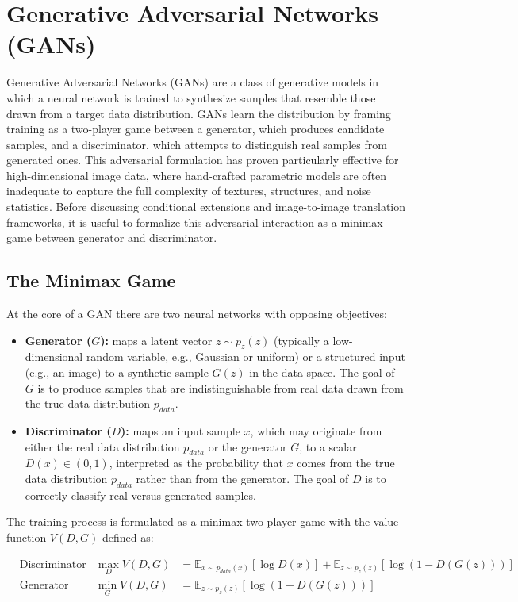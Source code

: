 \section{Generative Adversarial Networks (GANs)}
\label{sec:gan_theory}
Generative Adversarial Networks (GANs) \cite{Goodfellow_2014} are a class of generative models in which a neural network is trained to synthesize samples that resemble those drawn from a target data distribution.
GANs learn the distribution by framing training as a two-player game between a generator, which produces candidate samples, and a discriminator, which attempts to distinguish real samples from generated ones.
This adversarial formulation has proven particularly effective for high-dimensional image data, where hand-crafted parametric models are often inadequate to capture the full complexity of textures, structures, and noise statistics.
Before discussing conditional extensions and image-to-image translation frameworks, it is useful to formalize this adversarial interaction as a minimax game between generator and discriminator.

\subsection{The Minimax Game}
At the core of a GAN there are two neural networks with opposing objectives:
\begin{itemize}
    \item \textbf{Generator ($G$):} maps a latent vector $z \sim p_z(z)$ (typically a low-dimensional random variable, e.g., Gaussian or uniform) or a structured input (e.g., an image) to a synthetic sample $G(z)$ in the data space. The goal of $G$ is to produce samples that are indistinguishable from real data drawn from the true data distribution $p_{data}$.
    \item \textbf{Discriminator ($D$):} maps an input sample $x$, which may originate from either the real data distribution $p_{data}$ or the generator $G$, to a scalar $D(x) \in (0,1)$, interpreted as the probability that $x$ comes from the true data distribution $p_{data}$ rather than from the generator. The goal of $D$ is to correctly classify real versus generated samples.
\end{itemize}

The training process is formulated as a minimax two-player game with the value function $V(D, G)$ defined as:

\begin{align}
    &\text{Discriminator Objective:} & \max_D V(D, G) &= \mathbb{E}_{x \sim p_{data}(x)}[\log D(x)] + \mathbb{E}_{z \sim p_z(z)}[\log (1 - D(G(z)))] \\
    &\text{Generator Objective:} & \min_G V(D, G) &= \mathbb{E}_{z \sim p_z(z)}[\log (1 - D(G(z)))]
\end{align}

